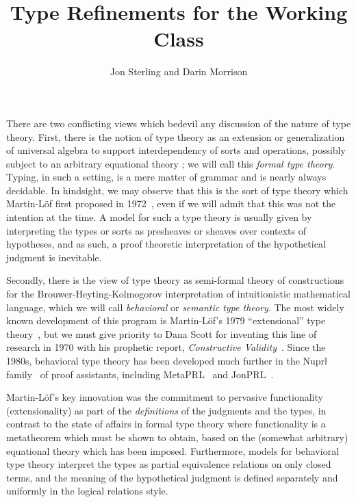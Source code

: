 \documentclass[11pt]{article}
\theoremstyle{definition}
\theoremstyle{remark}
\numberwithin{equation}{section}
\begin{document}
\title{Type Refinements for the Working Class}
\date{}
\author{Jon Sterling and Darin Morrison}
\maketitle

There are two conflicting views which bedevil any discussion of the nature of
type theory. First, there is the notion of type theory as an extension or
generalization of universal algebra to support interdependency of sorts and
operations, possibly subject to an arbitrary equational theory
\cite{cartmell:1986, dybjer:1996}; we will call this \emph{formal type theory}.
Typing, in such a setting, is a mere matter of grammar and is nearly always
decidable. In hindsight, we may observe that this is the sort of type theory
which Martin-L\"of first proposed in 1972~\cite{martin-lof:1972}, even if we
will admit that this was not the intention at the time. A model for such a type
theory is usually given by interpreting the types or sorts as presheaves or
sheaves over contexts of hypotheses, and as such, a proof theoretic
interpretation of the hypothetical judgment is inevitable.

Secondly, there is the view of type theory as semi-formal theory of
constructions for the Brouwer-Heyting-Kolmogorov interpretation of
intuitionistic mathematical language, which we will call \emph{behavioral} or
\emph{semantic type theory}. The most widely known development of this program
is Martin-L\"of's 1979 ``extensional'' type theory~\cite{martin-lof:1979,
martin-lof:1984}, but we must give priority to Dana Scott for inventing this
line of research in 1970 with his prophetic report, \emph{Constructive
Validity}~\cite{scott:1970}. Since the 1980s, behavioral type theory has been
developed much further in the Nuprl family~\cite{constable:1986} of proof
assistants, including MetaPRL~\cite{hickey:2003} and JonPRL~\cite{jonprl:2015}.

Martin-L\"of's key innovation was the commitment to pervasive functionality
(extensionality) as part of the \emph{definitions} of the judgments and the
types, in contrast to the state of affairs in formal type theory where
functionality is a metatheorem which must be shown to obtain, based on the
(somewhat arbitrary) equational theory which has been imposed. Furthermore,
models for behavioral type theory interpret the types as partial equivalence
relations on only closed terms, and the meaning of the hypothetical judgment is
defined separately and uniformly in the logical relations style.
\end{document}
